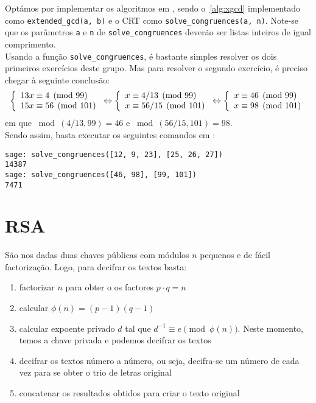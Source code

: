 Optámos por implementar os algoritmos em \sage, sendo o~\ref{alg:xgcd} implementado como \verb|extended_gcd(a, b)| e o CRT como \verb|solve_congruences(a, n)|. Note-se que os parâmetros \verb|a| e \verb|n| de \verb|solve_congruences| deverão ser listas inteiros de igual comprimento.\\
Usando a função \verb|solve_congruences|, é bastante simples resolver os dois primeiros exercícios deste grupo. Mas para resolver o segundo exercício, é preciso chegar à seguinte conclusão:
\begin{equation*}
\left\{
  \begin{array}{l l}
    13x \equiv 4  \pmod{99}  \\
    15x \equiv 56 \pmod{101} \\
  \end{array}
\right.
\Leftrightarrow
\left\{
  \begin{array}{l l}
    x \equiv 4/13  \pmod{99}  \\
    x \equiv 56/15 \pmod{101} \\
  \end{array}
\right.
\Leftrightarrow
\left\{
  \begin{array}{l l}
    x \equiv 46  \pmod{99} \\
    x \equiv 98 \pmod{101} \\
  \end{array}
\right.
\end{equation*}
em que $\bmod{(4/13, 99)} = 46$ e $\bmod{(56/15, 101)} = 98$.\\
Sendo assim, basta executar os seguintes comandos em \sage:
\scriptsize\begin{verbatim}
sage: solve_congruences([12, 9, 23], [25, 26, 27])
14387
sage: solve_congruences([46, 98], [99, 101])
7471
\end{verbatim}\normalsize
\section{RSA}
São nos dadas duas chaves públicas com módulos $n$ pequenos e de fácil factorização. Logo, para decifrar os textos basta:
\begin{enumerate}
  \item factorizar $n$ para obter o os factores $p \cdot q = n$
  \item calcular $\phi(n) = (p-1)(q-1)$
  \item calcular expoente privado $d$ tal que $d^{-1} \equiv e \pmod{\phi(n)}$. Neste momento, temos a chave privada e podemos decifrar os textos
  \item decifrar os textos número a número, ou seja, decifra-se um número de cada vez para se obter o trio de letras original
  \item concatenar os resultados obtidos para criar o texto original
\end{enumerate}
